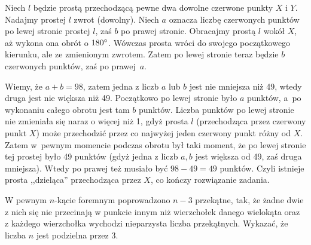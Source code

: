 \vspace{10px}
\noindent
Niech $l$ będzie prostą przechodzącą pewne dwa dowolne czerwone punkty $X$ i $Y$. Nadajmy prostej $l$ zwrot (dowolny). Niech $a$ oznacza liczbę czerwonych punktów po lewej stronie prostej $l$, zaś $b$ po prawej stronie. Obracajmy prostą $l$ wokół $X$, aż wykona ona obrót o $180\degree$. Wówczas prosta wróci do swojego początkowego kierunku, ale ze zmienionym zwrotem. Zatem po lewej stronie teraz będzie $b$ czerwonych punktów, zaś po prawej~$a$. 

\vspace{10px}
\noindent
Wiemy, że $a+b=98$, zatem jedna z liczb $a$ lub $b$ jest nie mniejsza niż 49, wtedy druga jest nie większa niż 49. Początkowo po lewej stronie było $a$ punktów, a~po wykonaniu całego obrotu jest tam $b$ punktów. Liczba punktów po lewej stronie nie zmieniała się naraz o więcej niż 1, gdyż prosta $l$ (przechodząca przez czerwony punkt $X$) może przechodzić przez co najwyżej jeden czerwony punkt różny od $X$. Zatem w~pewnym momencie podczas obrotu był taki moment, że po lewej stronie tej prostej było 49 punktów (gdyż jedna z liczb $a, b$ jest większa od 49, zaś druga mniejsza). Wtedy po prawej też musiało być $98-49=49$ punktów. Czyli istnieje prosta ,,dzieląca'' przechodząca przez $X$, co kończy rozwiązanie zadania.

 \vspace{5px}

 
\begin{problem}{5}
	W pewnym $n$-kącie foremnym poprowadzono $n - 3$ przekątne, tak, że żadne dwie z nich się nie przecinają w punkcie innym niż wierzchołek danego wielokąta oraz z każdego wierzchołka wychodzi nieparzysta liczba przekątnych. Wykazać, że liczba $n$ jest podzielna przez $3$.
\end{problem}


\begin{center}
\end{center}

